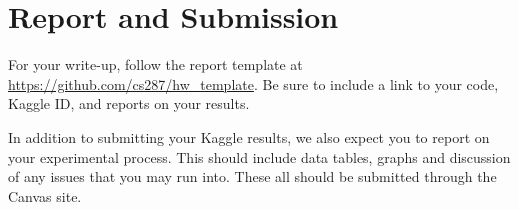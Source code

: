 \documentclass[11pt]{article}
\begin{document}
\section{Report and Submission}

For your write-up, follow the report template at
\url{https://github.com/cs287/hw_template}. Be sure to include a link
to your code, Kaggle ID, and reports on your results.

In addition to submitting your Kaggle results, we also expect you to report on your 
experimental process. This should include data tables, graphs and discussion of any 
issues that you may run into. These all should be submitted through the Canvas site. 

 

\end{document}
